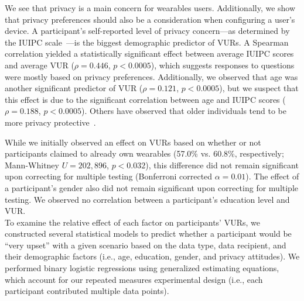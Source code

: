 \documentclass{sig-alternate-hotpets15}
\begin{document}
We see that privacy is a main concern for wearables users. Additionally, we show that privacy preferences should also be a consideration when configuring a user's device. A participant's self-reported level of privacy concern---as determined by the IUIPC scale~\cite{malhotra2004internet}---is the biggest demographic predictor of VURs. A Spearman correlation yielded a statistically significant effect between average IUIPC scores and average VUR ($\rho=0.446$, $p<0.0005$), which suggests responses to questions were mostly based on privacy preferences. Additionally, we observed that age was another significant predictor of VUR ($\rho=0.121$, $p<0.0005$), but we suspect that this effect is due to the significant correlation between age and IUIPC scores ($\rho=0.188$, $p<0.0005$). Others have observed that older individuals tend to be more privacy protective~\cite{varian2005demographics}.

While we initially observed an effect on VURs based on whether or not participants claimed to already own wearables (57.0\% vs. 60.8\%, respectively; Mann-Whitney $U=202,896$, $p<0.032$), this difference did not remain significant upon correcting for multiple testing (Bonferroni corrected $\alpha=0.01$). The effect of a participant's gender also did not remain significant upon correcting for multiple testing. We observed no correlation between a participant's education level and VUR.\\

\label{sec:regression}
To examine the relative effect of each factor on participants' VURs, we constructed several statistical models to predict whether a participant would be ``very upset'' with a given scenario based on the data type, data recipient, and their demographic factors (i.e., age, education, gender, and privacy attitudes). We performed binary logistic regressions using generalized estimating equations, which account for our repeated measures experimental design (i.e., each participant contributed multiple data points).
\end{document}
